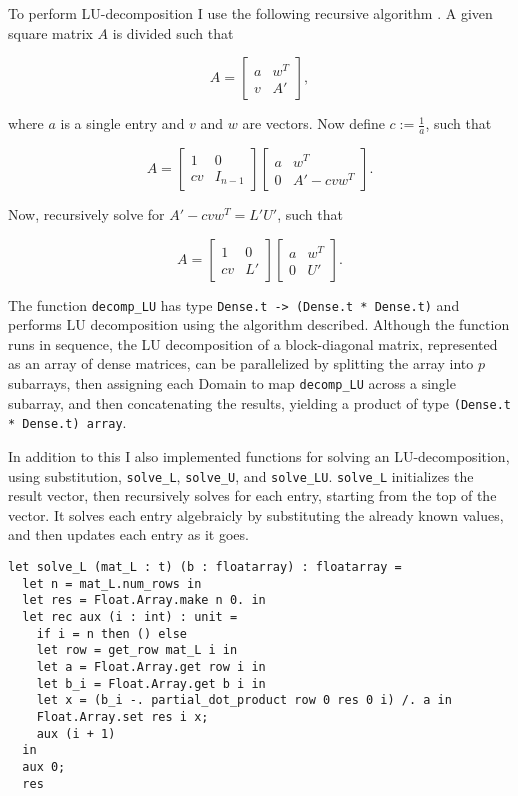 \documentclass[pageno]{jpaper}
\begin{document}
\begin{doublespacing}
To perform LU-decomposition I use the following recursive algorithm \cite{lu-decomp-ref}. A given square matrix $A$ is divided such that

$$A = \left[ \begin{array}{c|c} a & w^T \\ \hline v & A' \end{array} \right],$$

where $a$ is a single entry and $v$ and $w$ are vectors. Now define $c := \frac{1}{a}$, such that

$$A = \left[ \begin{array}{c|c} 1 & 0 \\ \hline cv & I_{n - 1} \end{array} \right] \left[ \begin{array}{c|c} a & w^T \\ \hline 0 & A' - cvw^T \end{array} \right].$$

Now, recursively solve for $A' - cvw^T = L' U'$, such that

$$A = \left[ \begin{array}{c|c} 1 & 0 \\ \hline cv & L' \end{array} \right] \left[ \begin{array}{c|c} a & w^T \\ \hline 0 & U' \end{array} \right].$$

The function \verb|decomp_LU| has type \verb|Dense.t -> (Dense.t * Dense.t)| and performs LU decomposition using the algorithm described. Although the function runs in sequence, the LU decomposition of a block-diagonal matrix, represented as an array of dense matrices, can be parallelized by splitting the array into $p$ subarrays, then assigning each Domain to map \verb|decomp_LU| across a single subarray, and then concatenating the results, yielding a product of type \verb|(Dense.t * Dense.t) array|.

In addition to this I also implemented functions for solving an LU-decomposition, using substitution, \verb|solve_L|, \verb|solve_U|, and \verb|solve_LU|. \verb|solve_L| initializes the result vector, then recursively solves for each entry, starting from the top of the vector. It solves each entry algebraicly by substituting the already known values, and then updates each entry as it goes.

\begin{verbatim}
let solve_L (mat_L : t) (b : floatarray) : floatarray = 
  let n = mat_L.num_rows in
  let res = Float.Array.make n 0. in
  let rec aux (i : int) : unit = 
    if i = n then () else
    let row = get_row mat_L i in
    let a = Float.Array.get row i in
    let b_i = Float.Array.get b i in 
    let x = (b_i -. partial_dot_product row 0 res 0 i) /. a in
    Float.Array.set res i x;
    aux (i + 1)
  in
  aux 0;
  res
\end{verbatim}


\end{doublespacing}
\end{document}
